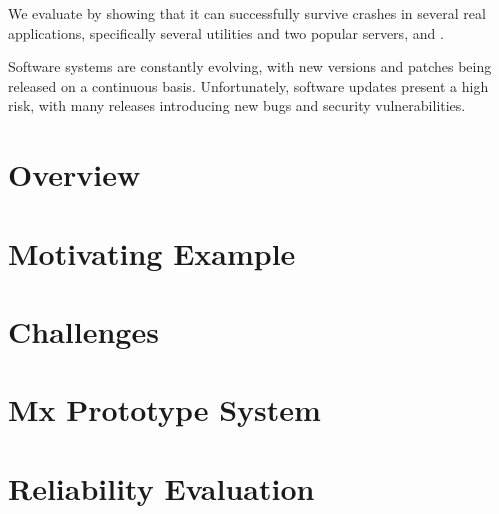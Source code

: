 We evaluate \mx by showing that it can successfully survive crashes in
several real applications, specifically several \coreutils utilities and
two popular servers, \lighttpd and \redis.

Software systems are constantly evolving, with new versions and
patches being released on a continuous basis.  Unfortunately, software
updates present a high risk, with many releases introducing new bugs
and security vulnerabilities.

\section{Overview}

\section{Motivating Example}
\label{sec:example}


\section{Challenges}

\section{Mx Prototype System}
\label{sec:mx}


\section{Reliability Evaluation}
\label{sec:reliability-evaluation}


%

%

%

%

%

%
